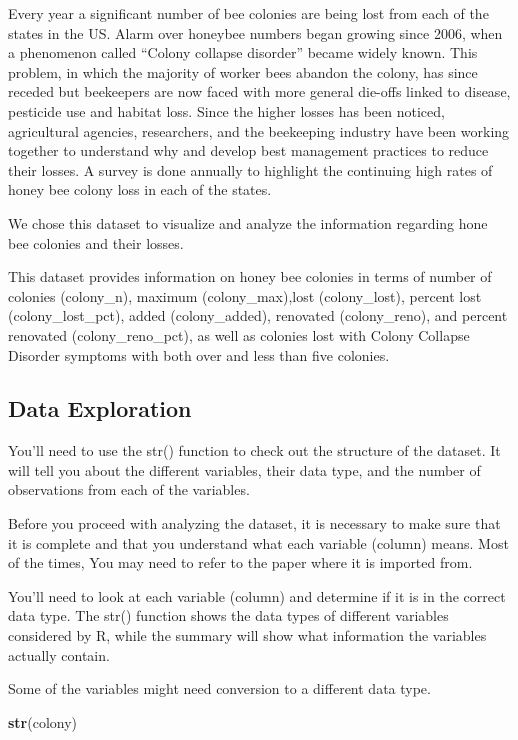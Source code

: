 \documentclass[
]{article}
\newenvironment{Shaded}{\begin{snugshade}}{\end{snugshade}}
\newcommand{\FunctionTok}[1]{\textcolor[rgb]{0.13,0.29,0.53}{\textbf{#1}}}
\newcommand{\NormalTok}[1]{#1}
\begin{document}
Every year a significant number of bee colonies are being lost from each
of the states in the US. Alarm over honeybee numbers began growing since
2006, when a phenomenon called ``Colony collapse disorder'' became
widely known. This problem, in which the majority of worker bees abandon
the colony, has since receded but beekeepers are now faced with more
general die-offs linked to disease, pesticide use and habitat loss.
Since the higher losses has been noticed, agricultural agencies,
researchers, and the beekeeping industry have been working together to
understand why and develop best management practices to reduce their
losses. A survey is done annually to highlight the continuing high rates
of honey bee colony loss in each of the states.

We chose this dataset to visualize and analyze the information regarding
hone bee colonies and their losses.

This dataset provides information on honey bee colonies in terms of
number of colonies (colony\_n), maximum (colony\_max),lost
(colony\_lost), percent lost (colony\_lost\_pct), added (colony\_added),
renovated (colony\_reno), and percent renovated (colony\_reno\_pct), as
well as colonies lost with Colony Collapse Disorder symptoms with both
over and less than five colonies.

\subsection{Data Exploration}\label{data-exploration}

You'll need to use the str() function to check out the structure of the
dataset. It will tell you about the different variables, their data
type, and the number of observations from each of the variables.

Before you proceed with analyzing the dataset, it is necessary to make
sure that it is complete and that you understand what each variable
(column) means. Most of the times, You may need to refer to the paper
where it is imported from.

You'll need to look at each variable (column) and determine if it is in
the correct data type. The str() function shows the data types of
different variables considered by R, while the summary will show what
information the variables actually contain.

Some of the variables might need conversion to a different data type.

\begin{Shaded}
\begin{Highlighting}[]
\FunctionTok{str}\NormalTok{(colony)}
\end{Highlighting}
\end{Shaded}
\end{document}
